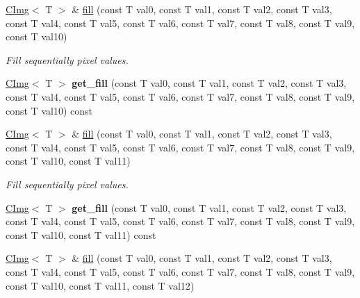 \begin{DoxyCompactItemize}
\item 
\hypertarget{structcimg__library_1_1CImg_a24eb4c4e80f15a98b956c057cbf5080f}{
\hyperlink{structcimg__library_1_1CImg}{CImg}$<$ T $>$ \& \hyperlink{structcimg__library_1_1CImg_a24eb4c4e80f15a98b956c057cbf5080f}{fill} (const T val0, const T val1, const T val2, const T val3, const T val4, const T val5, const T val6, const T val7, const T val8, const T val9, const T val10)}
\label{structcimg__library_1_1CImg_a24eb4c4e80f15a98b956c057cbf5080f}

\begin{DoxyCompactList}\small\item\em Fill sequentially pixel values. \item\end{DoxyCompactList}\item 
\hypertarget{structcimg__library_1_1CImg_ad8924215033e173547e5c36752a1fe78}{
\hyperlink{structcimg__library_1_1CImg}{CImg}$<$ T $>$ {\bfseries get\_\-fill} (const T val0, const T val1, const T val2, const T val3, const T val4, const T val5, const T val6, const T val7, const T val8, const T val9, const T val10) const }
\label{structcimg__library_1_1CImg_ad8924215033e173547e5c36752a1fe78}

\item 
\hypertarget{structcimg__library_1_1CImg_a922d157e090636af9bce74d4485df06f}{
\hyperlink{structcimg__library_1_1CImg}{CImg}$<$ T $>$ \& \hyperlink{structcimg__library_1_1CImg_a922d157e090636af9bce74d4485df06f}{fill} (const T val0, const T val1, const T val2, const T val3, const T val4, const T val5, const T val6, const T val7, const T val8, const T val9, const T val10, const T val11)}
\label{structcimg__library_1_1CImg_a922d157e090636af9bce74d4485df06f}

\begin{DoxyCompactList}\small\item\em Fill sequentially pixel values. \item\end{DoxyCompactList}\item 
\hypertarget{structcimg__library_1_1CImg_a34f07ae9dc4aadbf62359b3f4c774f4d}{
\hyperlink{structcimg__library_1_1CImg}{CImg}$<$ T $>$ {\bfseries get\_\-fill} (const T val0, const T val1, const T val2, const T val3, const T val4, const T val5, const T val6, const T val7, const T val8, const T val9, const T val10, const T val11) const }
\label{structcimg__library_1_1CImg_a34f07ae9dc4aadbf62359b3f4c774f4d}

\item 
\hypertarget{structcimg__library_1_1CImg_a72227edc72ffbf6cf87298e27b59d9f9}{
\hyperlink{structcimg__library_1_1CImg}{CImg}$<$ T $>$ \& \hyperlink{structcimg__library_1_1CImg_a72227edc72ffbf6cf87298e27b59d9f9}{fill} (const T val0, const T val1, const T val2, const T val3, const T val4, const T val5, const T val6, const T val7, const T val8, const T val9, const T val10, const T val11, const T val12)}
\label{structcimg__library_1_1CImg_a72227edc72ffbf6cf87298e27b59d9f9}


\end{DoxyCompactItemize}
